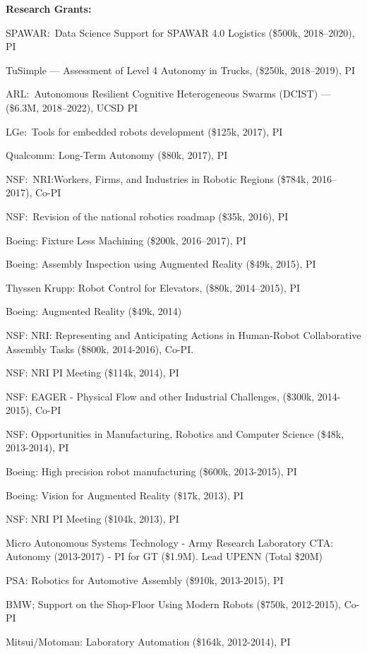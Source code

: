 \documentclass{article}
\begin{document}
\begin{cv}
\begin{cvlist}{\bf Research Grants:}
		\item SPAWAR:\ Data Science Support for SPAWAR 4.0 Logistics (\$500k,
		2018--2020), PI
		\item TuSimple --- Assessment of Level 4 Autonomy in Trucks,  (\$250k,
		2018--2019), PI
		\item ARL:\ Autonomous Resilient Cognitive Heterogeneous Swarms
		(DCIST) --- (\$6.3M, 2018--2022), UCSD PI
		\item LGe:\ Tools for embedded robots development (\$125k, 2017), PI
		\item Qualcomm: Long-Term Autonomy (\$80k, 2017), PI
		\item NSF:\ NRI:Workers, Firms, and Industries in Robotic Regions
		(\$784k, 2016--2017), Co-PI
		\item NSF:\ Revision of the national robotics roadmap (\$35k, 2016), PI
		\item Boeing: Fixture Less Machining (\$200k, 2016--2017), PI
		\item Boeing: Assembly Inspection using Augmented Reality (\$49k,
		2015), PI
		\item Thyssen Krupp: Robot Control for Elevators, (\$80k, 2014--2015), PI
		\item Boeing: Augmented Reality (\$49k, 2014)
		\item NSF: NRI: Representing and Anticipating Actions in Human-Robot
		Collaborative Assembly Tasks (\$800k, 2014-2016), Co-PI.
		\item NSF: NRI PI Meeting (\$114k, 2014), PI
		\item NSF: EAGER - Physical Flow and other Industrial Challenges,
		(\$300k, 2014-2015), Co-PI
		\item NSF: Opportunities in Manufacturing, Robotics and Computer Science
		(\$48k, 2013-2014), PI
		\item Boeing: High precision robot manufacturing (\$600k, 2013-2015), PI
		\item Boeing: Vision for Augmented Reality (\$17k, 2013), PI
		\item NSF: NRI PI Meeting (\$104k, 2013), PI
		\item Micro Autonomous Systems Technology - Army Research Laboratory
		CTA: Autonomy (2013-2017) - PI for GT (\$1.9M). Lead UPENN (Total
		\$20M) %
		\item PSA: Robotics for Automotive Assembly (\$910k, 2013-2015), PI
		\item BMW; Support on the Shop-Floor Using Modern Robots (\$750k,
		2012-2015), Co-PI
		\item Mitsui/Motoman: Laboratory Automation (\$164k, 2012-2014), PI

\end{cvlist}
\end{cv}
\end{document}
